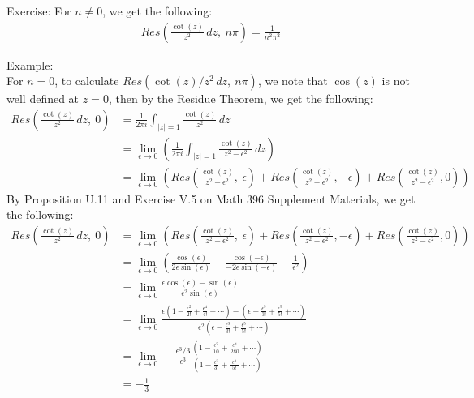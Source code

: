\documentclass[11pt,oneside]{book}
\theoremstyle{break}
\theoremstyle{break}
\newcommand{\example}{\color{green}Example: \color{black}}
\newcommand{\exercise}{\color{green}Exercise: \color{black}}
\begin{document}
\exercise For $n \neq 0$, we get the following:
\begin{align*}
Res\left(\frac{\cot(z)}{z^2}\, dz, \ n\pi\right) = \frac{1}{n^2 \pi^2} 
\end{align*}


\example \\For $n = 0$, to calculate $Res(\cot(z)/z^2\, dz, \ n\pi)$, we note that $\cos(z)$ is not well defined at $z = 0$, then by the Residue Theorem, we get the following:
\begin{align*}
Res\left(\frac{\cot(z)}{z^2}\, dz, \ 0\right) &= \frac{1}{2\pi i}\int_{|z|=1}\frac{\cot (z)}{z^2}\, dz \\
&= \lim_{\epsilon\to 0}\left( \frac{1}{2\pi i}\int_{|z| = 1}\frac{\cot(z)}{z^2 - \epsilon^2}\, dz \right) \\
&= \lim_{\epsilon \to 0}\left( Res\left(\frac{\cot(z)}{z^2 - \epsilon^2} ,\ \epsilon\right) + Res\left(\frac{\cot(z)}{z^2 - \epsilon^2} , -\epsilon\right) + Res\left(\frac{\cot(z)}{z^2 - \epsilon^2}, 0\right)\right)
\end{align*}
By Proposition U.11 and Exercise V.5 on Math 396 Supplement Materials, we get the following:
\begin{align*}
Res\left(\frac{\cot(z)}{z^2}\, dz, \ 0\right) 
&= \lim_{\epsilon \to 0}\left( Res\left(\frac{\cot(z)}{z^2 - \epsilon^2} ,\ \epsilon\right) + Res\left(\frac{\cot(z)}{z^2 - \epsilon^2} , -\epsilon\right) + Res\left(\frac{\cot(z)}{z^2 - \epsilon^2}, 0\right)\right)\\
&= \lim_{\epsilon \to 0}\left( \frac{\cos(\epsilon)}{2\epsilon \sin(\epsilon)} + \frac{\cos(-\epsilon)}{-2\epsilon \sin(-\epsilon)} -\frac{1}{\epsilon^2}\right)\\ 
&= \lim_{\epsilon\to 0}\frac{\epsilon\cos(\epsilon)-\sin(\epsilon)}{\epsilon^2 \sin(\epsilon)}\\
&= \lim_{\epsilon\to 0}\frac{\epsilon(1- \frac{\epsilon^2}{2!}+\frac{\epsilon^4}{4!}+ \cdots) - ( \epsilon - \frac{\epsilon^3}{3!}+ \frac{\epsilon^5}{5!}+\cdots )}{\epsilon^2( \epsilon - \frac{\epsilon^3}{3!}+ \frac{\epsilon^5}{5!}+\cdots )}\\
&= \lim_{\epsilon\to 0} -\frac{\epsilon^3/3}{\epsilon^3} \frac{( 1 - \frac{\epsilon^2}{10}+ \frac{\epsilon^4}{280}+\cdots )}{( 1 - \frac{\epsilon^2}{3!}+ \frac{\epsilon^4}{\,\,5!\,\,}+\cdots )} \\
&= -\frac{1}{3}
\end{align*}

\newpage
\end{document}
